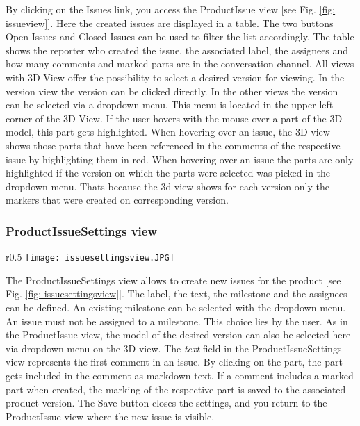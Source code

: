 By clicking on the Issues link, you access the ProductIssue view [see Fig. \ref{fig: issueview}]. Here the created issues are displayed in a table. The two buttons Open Issues and Closed Issues can be used to filter the list accordingly. The table shows the reporter who created the issue, the associated label, the assignees and how many comments and marked parts are in the conversation channel. 
All views with 3D View offer the possibility to select a desired version for viewing. In the version view the version can be clicked directly. In the other views the version can be selected via a dropdown menu. This menu is located in the upper left corner of the 3D View. 
If the user hovers with the mouse over a part of the 3D model, this part gets highlighted. 
When hovering over an issue, the 3D view shows those parts that have been referenced in the comments of the respective issue by highlighting them in red.
When hovering over an issue the parts are only highlighted if the version on which the parts were selected was picked in the dropdown menu. Thats because the 3d view shows for each version only the markers that were created on corresponding version.

\subsubsection{ProductIssueSettings view}

\begin{wrapfigure}{r}{0.5\textwidth}
    \centering
    \texttt{[image: issuesettingsview.JPG]}
    \caption{Issuesettings view}
    \label{fig: issuesettingsview}
\end{wrapfigure}

The ProductIssueSettings view allows to create new issues for the product [see Fig. \ref{fig: issuesettingsview}]. The label, the text, the milestone and the assignees can be defined. An existing milestone can be selected with the dropdown menu. An issue must not be assigned to a milestone. This choice lies by the user. 
As in the ProductIssue view, the model of the desired version can also be selected here via dropdown menu on the 3D view.
The \textit{text} field in the ProductIssueSettings view represents the first comment in an issue. By clicking on the part, the part gets included in the comment as markdown text. If a comment includes a marked part when created, the marking of the respective part is saved to the associated product version.
The Save button closes the settings, and you return to the ProductIssue view where the new issue is visible.

